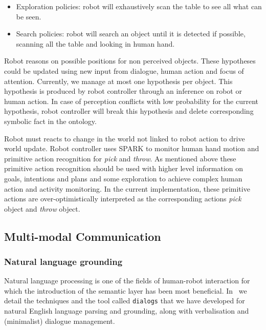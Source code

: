 \documentclass[preprint,12pt]{elsarticle}
\begin{document}
\begin {itemize}
\item Exploration policies: robot will exhaustively scan the table to
  see all what can be seen.

\item Search policies: robot will search an object until it is
  detected if possible, scanning all the table and looking in human
  hand.

\end {itemize} 

Robot reasons on possible positions for non perceived
objects. These hypotheses could be updated using new input from dialogue, human
action and focus of attention. Currently, we manage at most one hypothesis per
object. This hypothesis is produced by robot controller through an inference on
robot or human action. In case of perception conflicts with low probability for
the current hypothesis, robot controller will break this hypothesis and delete
corresponding symbolic fact in the ontology.

Robot must reacts to change in the world not linked to robot
action to drive world update. Robot controller uses SPARK to monitor human hand
motion and primitive action recognition for \emph{pick} and \emph{throw}. As
mentioned above these primitive action recognition should be used with higher
level information on goals, intentions and plans and some exploration to
achieve complex human action and activity monitoring.  In the current
implementation, these primitive actions are over-optimistically interpreted as
the corresponding actions \emph{pick} object and \emph{throw} object.




\subsection{Multi-modal Communication}
\label{sect|com}

\subsubsection{Natural language grounding}

Natural language processing is one of the fields of human-robot interaction
for which the introduction of the semantic layer has been most beneficial.
In~\cite{Lemaignan2011a} we detail the techniques and the tool called
\texttt{dialogs} that we have developed for natural English language parsing and
grounding, along with verbalisation and (minimalist) dialogue management.
\end{document}

